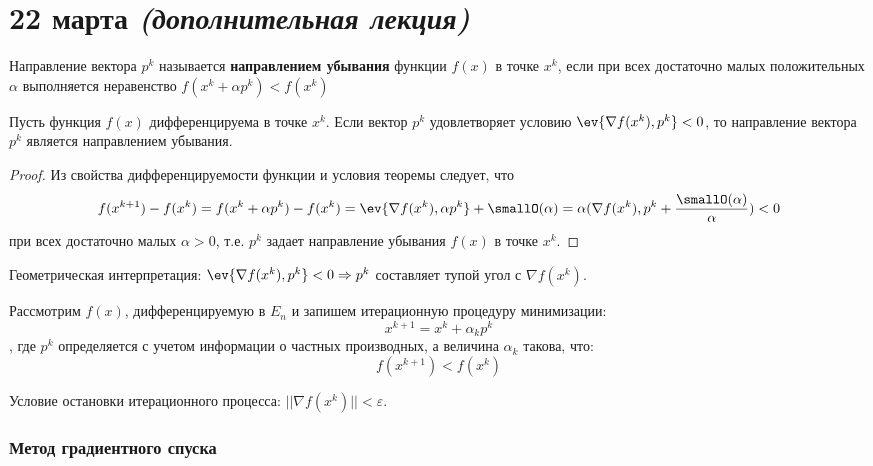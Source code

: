 \chapter{22 марта \textit{(дополнительная лекция)}}

\begin{definition}
    Направление вектора \(p^k\) называется \textbf{направлением убывания} функции \(f(x)\) в точке \(x^k\), если при всех достаточно малых положительных \(\alpha\) выполняется неравенство \(f(x^k + \alpha p^k) < f(x^k)\)
\end{definition}

\begin{theorem}
    Пусть функция \(f(x)\) дифференцируема в точке \(x^k\). Если вектор \(p^k\) удовлетворяет условию \(\ev{\nabla f(x^k), p^k} < 0\), то направление вектора \(p^k\) является направлением убывания.
\end{theorem}
\begin{proof}
    Из свойства дифференцируемости функции и условия теоремы следует, что
    \[f(x^{k + 1}) - f(x^k) = f(x^k + \alpha p^k) - f(x^k) = \ev{\nabla f(x^k), \alpha p^k} + \smallO(\alpha) = \alpha(\nabla f(x^k), p^k + \frac{\smallO(\alpha)}{\alpha} ) < 0\]
    при всех достаточно малых \(\alpha > 0\), т.е. \(p^k\) задает направление убывания \(f(x)\) в точке \(x^k\).
\end{proof}

Геометрическая интерпретация: \(\ev{\nabla f(x^k), p^k} < 0 \Rightarrow p^k\) составляет тупой угол с \(\nabla f(x^k)\).

Рассмотрим \(f(x)\), дифференцируемую в \(E_n\) и запишем итерационную процедуру минимизации:
\begin{equation}
    x^{k + 1} = x^k + \alpha_k p^k
    \label{итерационный процесс}
\end{equation}
, где \(p^k\) определяется с учетом информации о частных производных, а величина \(\alpha_k\) такова, что:
\begin{equation}
    f(x^{k + 1}) < f(x^k)
    \label{уменьшение f}
\end{equation}

Условие остановки итерационного процесса: \(||\nabla f(x^k)|| < \varepsilon\).

\subsection{Метод градиентного спуска}

